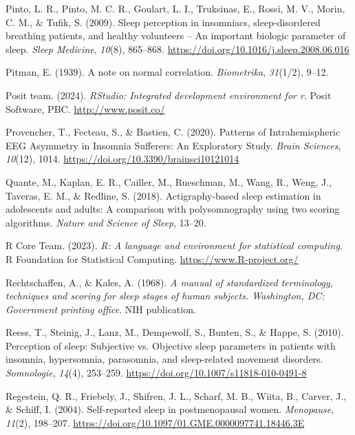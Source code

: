 \documentclass[
]{article}
\newlength{\cslhangindent}
\newenvironment{CSLReferences}[2] %
 {\begin{list}{}{%
  \setlength{\itemindent}{0pt}
  \setlength{\leftmargin}{0pt}
  \setlength{\parsep}{0pt}
  \ifodd #1
   \setlength{\leftmargin}{\cslhangindent}
   \setlength{\itemindent}{-1\cslhangindent}
  \fi
  \setlength{\itemsep}{#2\baselineskip}}}
 {\end{list}}
\begin{document}
\begin{CSLReferences}{1}{0}
Pinto, L. R., Pinto, M. C. R., Goulart, L. I., Truksinas, E., Rossi, M. V., Morin, C. M., \& Tufik, S. (2009). Sleep perception in insomniacs, sleep-disordered breathing patients, and healthy volunteers -- {An} important biologic parameter of sleep. \emph{Sleep Medicine}, \emph{10}(8), 865--868. \url{https://doi.org/10.1016/j.sleep.2008.06.016}

Pitman, E. (1939). A note on normal correlation. \emph{Biometrika}, \emph{31}(1/2), 9--12.

Posit team. (2024). \emph{RStudio: Integrated development environment for r}. Posit Software, PBC. \url{http://www.posit.co/}

Provencher, T., Fecteau, S., \& Bastien, C. (2020). Patterns of {Intrahemispheric} {EEG} {Asymmetry} in {Insomnia} {Sufferers}: {An} {Exploratory} {Study}. \emph{Brain Sciences}, \emph{10}(12), 1014. \url{https://doi.org/10.3390/brainsci10121014}

Quante, M., Kaplan, E. R., Cailler, M., Rueschman, M., Wang, R., Weng, J., Taveras, E. M., \& Redline, S. (2018). Actigraphy-based sleep estimation in adolescents and adults: A comparison with polysomnography using two scoring algorithms. \emph{Nature and Science of Sleep}, 13--20.

R Core Team. (2023). \emph{R: A language and environment for statistical computing}. R Foundation for Statistical Computing. \url{https://www.R-project.org/}

Rechtschaffen, A., \& Kales, A. (1968). \emph{A manual of standardized terminology, techniques and scoring for sleep stages of human subjects. Washington, DC: Government printing office}. NIH publication.

Reess, T., Steinig, J., Lanz, M., Dempewolf, S., Bunten, S., \& Happe, S. (2010). Perception of sleep: {Subjective} vs. Objective sleep parameters in patients with insomnia, hypersomnia, parasomnia, and sleep-related movement disorders. \emph{Somnologie}, \emph{14}(4), 253--259. \url{https://doi.org/10.1007/s11818-010-0491-8}

Regestein, Q. R., Friebely, J., Shifren, J. L., Scharf, M. B., Wiita, B., Carver, J., \& Schiff, I. (2004). Self-reported sleep in postmenopausal women. \emph{Menopause}, \emph{11}(2), 198--207. \url{https://doi.org/10.1097/01.GME.0000097741.18446.3E}


\end{CSLReferences}
\end{document}
